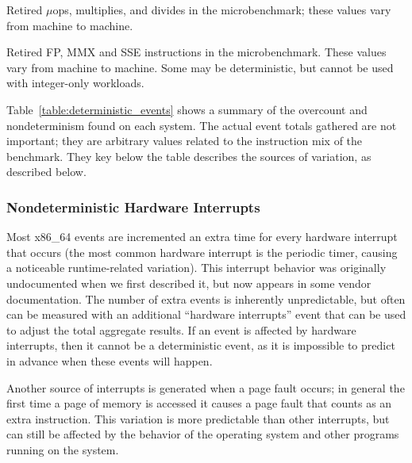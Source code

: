 
\begin{table*}[tbp]
\caption{Retired $\mu$ops, multiplies, and divides 
         in the microbenchmark;  these values vary from machine 
         to machine.}
\label{table:results_uops}

\centering

\end{table*}


\begin{table*}[tbp]

\caption{Retired FP, MMX and SSE instructions in the microbenchmark.
        These values vary from machine to machine.  
        Some may be
        deterministic, but cannot be used with integer-only 
        workloads.}
\label{table:results_fp}

\centering

\end{table*}


Table~\ref{table:deterministic_events} shows a summary of the overcount
and nondeterminism found on each system.  The actual event totals
gathered are not important; they are arbitrary values related to
the instruction mix of the benchmark.  They key below the table
describes the sources of variation, as described below.

\subsubsection{Nondeterministic Hardware Interrupts}

Most x86\_64 events are incremented an extra time for every hardware 
interrupt that occurs (the most common hardware interrupt is the 
periodic timer, causing a noticeable runtime-related variation).
This interrupt behavior was originally undocumented when we first
described it, but now appears in some vendor documentation.  
The number of extra events is inherently unpredictable,
but often can be measured with an additional ``hardware interrupts''
event that can be used to adjust the total aggregate results.  
If an event is affected by hardware interrupts, then it cannot be a 
deterministic event, as it is impossible to predict in advance when
these events will happen.

Another source of interrupts is generated
when a page fault occurs; in general
the first time a page of memory is accessed it causes a page fault 
that counts as an extra instruction.  This variation is more predictable
than other interrupts, but can still be affected by the behavior of
the operating system and other programs running on the system.


